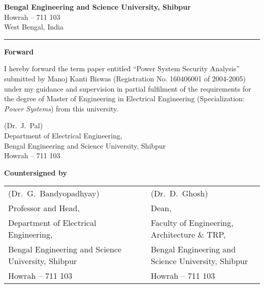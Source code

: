 \documentclass[a4paper,11pt]{article}
\begin{document}

\thispagestyle{empty}
\vspace*{0.25in}
\begin{center}
{\Large \textbf{Bengal Engineering and Science University, Shibpur}}\\
\vspace{3.5pt}
{\large Howrah -- 711 103}\\
\vspace{3.5pt}
{\large West Bengal, India}
\end{center}
\hrule

\vspace{0.75in}
\begin{center}
{\Large \textbf{Forward}}
\end{center}

\noindent I hereby forward the term paper entitled ``Power System Security Analysis'' submitted by Manoj Kanti Biswas (Registration No. 160406001 of 2004-2005) under my guidance and supervision in partial fulfilment of the requirements for the degree of Master of Engineering in Electrical Engineering (Specialization: \emph{Power Systems}) from this university.

\vspace{0.85in}
\begin{flushleft}
(Dr.~J.~Pal) \\ 
{\footnotesize Department of Electrical Engineering,}\\ 
{\footnotesize Bengal Engineering and Science University, Shibpur} \\ 
{\footnotesize Howrah -- 711 103} 

\vspace{1.0in}
\noindent \textbf{Countersigned by}

\vspace{0.8in}
\begin{tabular}{@{} lcl @{}}
(Dr.~G.~Bandyopadhyay)& & (Dr.~D.~Ghosh)\\
{\footnotesize Professor and Head,}& & {\footnotesize Dean,}\\
{\footnotesize Department of Electrical Engineering,}& &{\footnotesize Faculty of Engineering, Architecture \& TRP,}\\
{\footnotesize Bengal Engineering and Science University, Shibpur}& &{\footnotesize Bengal Engineering and Science University, Shibpur}\\
{\footnotesize Howrah -- 711 103}& &{\footnotesize Howrah -- 711 103}
\end{tabular}
\end{flushleft}
\clearpage
\end{document}
